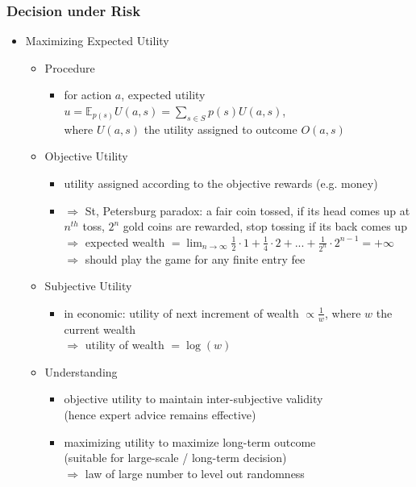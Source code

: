 \subsubsection{Decision under Risk}
\begin{itemize}
\item Maximizing Expected Utility
	\begin{itemize}
	\item Procedure
		\begin{itemize}
		\item for action $a$, expected utility $\displaystyle u = \mathbb E_{p(s)} U(a,s) = \sum_{s\in S} p(s)U(a,s)$, \\ 
		where $U(a,s)$ the utility assigned to outcome $O(a,s)$
		\end{itemize}
	\item Objective Utility
		\begin{itemize}
		\item utility assigned according to the objective rewards (e.g. money)
		\item $\Rightarrow$ St, Petersburg paradox: a fair coin tossed, if its head comes up at $n^{th}$ toss, $2^n$ gold coins are rewarded, stop tossing if its back comes up \\
		$\Rightarrow$ expected wealth $=\lim_{n\rightarrow \infty} \frac 12\cdot 1 + \frac 14\cdot 2 + ... + \frac 1{2^n}\cdot 2^{n-1} = +\infty$ \\
		$\Rightarrow$ should play the game for any finite entry fee
		\end{itemize}
	\item Subjective Utility
		\begin{itemize}
		\item in economic: utility of next increment of wealth $\propto \frac 1w$, where $w$ the current wealth \\
		$\Rightarrow$ utility of wealth $=\log(w)$
		\end{itemize}
	\item Understanding
		\begin{itemize}
		\item objective utility to maintain inter-subjective validity \\
		(hence expert advice remains effective)
		\item maximizing utility to maximize long-term outcome \\ 
		(suitable for large-scale / long-term decision) \\
		$\Rightarrow$ law of large number to level out randomness

\end{itemize}
\end{itemize}
\end{itemize}
